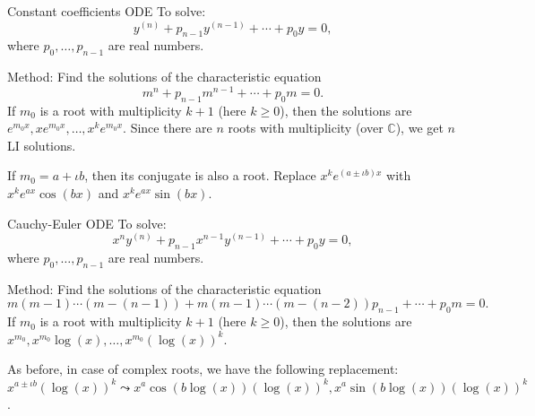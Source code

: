 \documentclass[dvipsnames]{beamer}
\theoremstyle{definition}
\let\ge\geqslant
\begin{document}
\begin{frame}{Constant coefficients ODE}
  To solve:
  \begin{equation*} 
    y^{(n)} + p_{n - 1} y^{(n - 1)} + \cdots + p_{0} y = 0,
  \end{equation*}
  where $p_{0}, \ldots, p_{n - 1}$ are real numbers. \pause

  Method: Find the solutions of the characteristic equation
  \begin{equation*} 
    m^{n} + p_{n - 1} m^{n - 1} + \cdots + p_{0} m = 0.
  \end{equation*} \pause
  If $m_{0}$ is a root with multiplicity $k + 1$ (here $k \ge 0$), \pause then the solutions are $e^{m_{0} x}, x e^{m_{0} x}, \ldots, x^{k} e^{m_{0} x}$. \pause 
  Since there are $n$ roots with multiplicity (over $\mathbb{C}$), we get $n$ LI solutions. \pause

  If $m_{0} = a + \iota b$, then its conjugate is also a root. \pause Replace $x^{k} e^{(a \pm \iota b) x}$ with $x^{k} e^{ax} \cos(bx)$ and $x^{k} e^{ax} \sin(bx)$.
\end{frame}
\begin{frame}{Cauchy-Euler ODE}
  To solve:
  \begin{equation*} 
    x^{n} y^{(n)} + p_{n - 1} x^{n - 1} y^{(n - 1)} + \cdots + p_{0} y = 0,
  \end{equation*}
  where $p_{0}, \ldots, p_{n - 1}$ are real numbers. \pause

  Method: Find the solutions of the characteristic equation
  \begin{equation*} 
    m(m - 1) \cdots (m - (n - 1)) + m(m - 1)\cdots(m - (n - 2)) p_{n - 1} + \cdots + p_{0} m = 0.
  \end{equation*} \pause
  If $m_{0}$ is a root with multiplicity $k + 1$ (here $k \ge 0$), \pause then the solutions are $x^{m_{0}}, x^{m_{0}} \log(x), \ldots, x^{m_{0}} (\log(x))^{k}$. \pause 

  As before, in case of complex roots, we have the following replacement: \pause \newline
  $x^{a \pm \iota b} (\log(x))^{k} \leadsto x^{a} \cos(b \log(x)) (\log(x))^{k}, x^{a} \sin(b \log(x)) (\log(x))^{k}$.
\end{frame}
\end{document}
